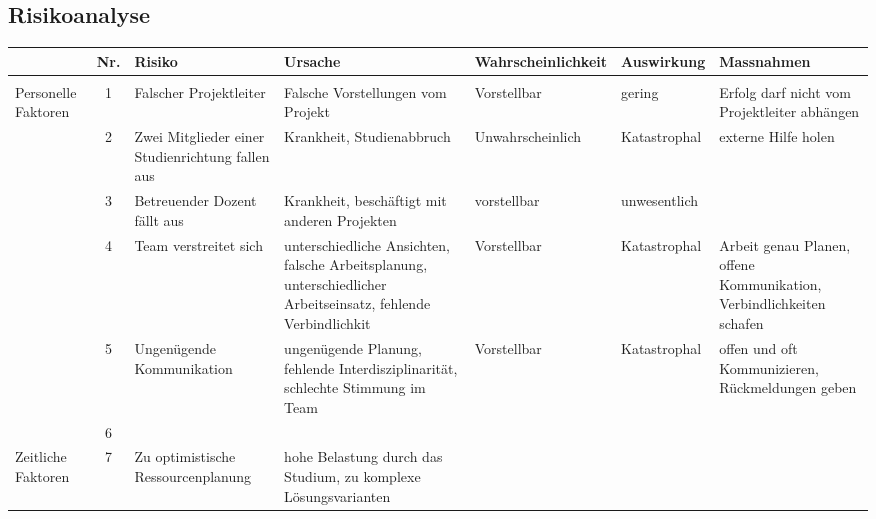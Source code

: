 \begin{landscape}
\section{Risikoanalyse}
\begin{table}[h!]
    \small
    \centering
    \begin{tabular}{p{} c p{} p{} p{} p{} p{}}
		& Nr. & Risiko & Ursache & Wahrscheinlichkeit & Auswirkung & Massnahmen \\
        \hline \hline
        & & & & & & \\
        \rowcolor{yellow} Personelle Faktoren 
            & 1 
            & Falscher Projektleiter 
            & Falsche Vorstellungen vom Projekt 
            & Vorstellbar 
            & gering 
            & Erfolg darf nicht vom Projektleiter abhängen \\ 
        \rowcolor{yellow}
	        & 2 
            & Zwei Mitglieder einer Studienrichtung fallen aus 
            & Krankheit, Studienabbruch 
            & Unwahrscheinlich 
            & Katastrophal 
            & externe Hilfe holen \\
        \rowcolor{green}
            & 3 
            & Betreuender Dozent fällt aus 
            & Krankheit, beschäftigt mit anderen Projekten 
            & vorstellbar 
            & unwesentlich 
            & \\
        \rowcolor{yellow}
            & 4	
            & Team verstreitet sich	
            & unterschiedliche Ansichten, falsche Arbeitsplanung, unterschiedlicher Arbeitseinsatz, fehlende Verbindlichkit	
            & Vorstellbar 
            & Katastrophal 
            & Arbeit genau Planen, offene Kommunikation, Verbindlichkeiten schafen \\
        \rowcolor{yellow}
            & 5	
            & Ungenügende Kommunikation 
            & ungenügende Planung, fehlende Interdisziplinarität, schlechte Stimmung im Team 
            & Vorstellbar 
            & Katastrophal 
            & offen und oft Kommunizieren, Rückmeldungen geben \\
        \rowcolor{yellow}
            & 6	
            & 
            & 
            & 
            & 
            & \\
        \rowcolor{yellow} Zeitliche Faktoren 
            & 7 
            & Zu optimistische Ressourcenplanung 
            & hohe Belastung durch das Studium, zu komplexe Lösungsvarianten 

\end{tabular}
\end{table}
\end{landscape}
